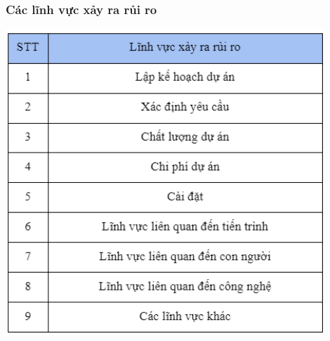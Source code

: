 \documentclass[12pt]{article}
\begin{document}
\subsubsection{Các lĩnh vực xảy ra rủi ro}
\includegraphics[width=12cm]{II_7_2.png}
\vspace{0.5cm}
\end{document}
